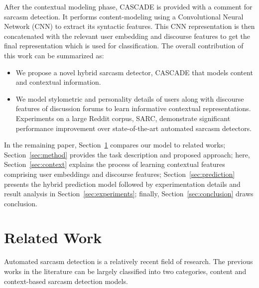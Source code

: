 \documentclass[11pt]{article}
\begin{document}
After the contextual modeling phase, CASCADE is provided with a comment for sarcasm detection. It performs content-modeling using a Convolutional Neural Network (CNN) to extract its syntactic features. This CNN representation is then concatenated with the relevant user embedding and discourse features to get the final representation which is used for classification. The overall contribution of this work can be summarized as:
\begin{itemize}[leftmargin=*,noitemsep]
    \item We propose a novel hybrid sarcasm detector, CASCADE that models content and contextual information.
      \item We model stylometric and personality details of users along with discourse features of discussion forums to learn informative contextual representations. Experiments on a large Reddit corpus, SARC, demonstrate significant performance improvement over state-of-the-art automated sarcasm detectors. 
\end{itemize}
In the remaining paper, Section~\ref{sec:related} compares our model to related works; Section~\ref{sec:method} provides the task description and proposed approach; here, Section~\ref{sec:context} explains the process of learning contextual features comprising user embeddings and discourse features; Section~\ref{sec:prediction} presents the hybrid prediction model followed by experimentation details and result analysis in Section~\ref{sec:experiments}; finally, Section~\ref{sec:conclusion} draws conclusion.








\section{Related Work} \label{sec:related}
Automated sarcasm detection is a relatively recent field of research. The previous works in the literature can be largely classified into two categories, content and context-based sarcasm detection models.
\end{document}
